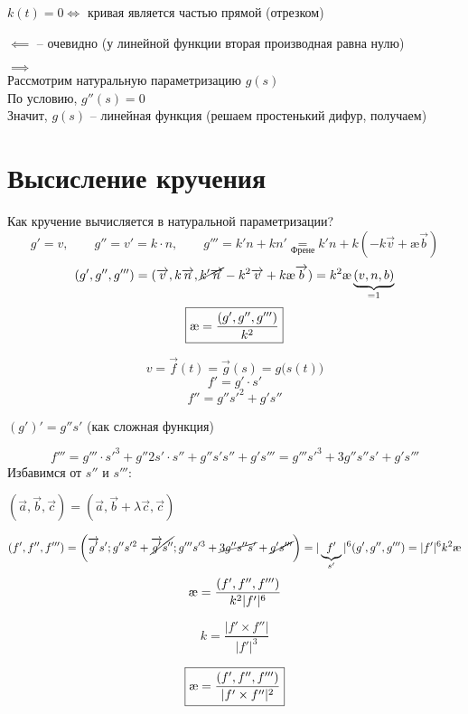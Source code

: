 \begin{theorem}
	$ k(t) = 0 \iff $ кривая является частью прямой (отрезком)
\end{theorem}

\begin{iproof}
	\item $ \impliedby $ -- очевидно (у линейной функции вторая производная равна нулю)
	\item $ \implies $ \\
	Рассмотрим натуральную параметризацию $ g(s) $ \\
	По условию, $ g''(s) = 0 $ \\
	Значит, $ g(s) $ -- линейная функция (решаем простенький дифур, получаем)
\end{iproof}

\section{Высисление кручения}

\begin{undefthm}{Как кручение вычисляется в натуральной параметризации?}
	$$ g' = v, \qquad g'' = v' = k \cdot n, \qquad g''' = k'n + kn' \underset{\text{Френе}}= k'n + k(-k\vec{v} + \text{\ae}\vec{b}) $$
	$$ (g', g'', g''') = (\vec{v}, k\vec{n}, \cancel{k'\vec{n}} - k^2\vec{v} + k\text\ae\vec{b}) = k^2 \text\ae\underbrace{(v, n, b)}_{= 1} $$
	$$ \boxed{\text\ae = \frac{(g', g'', g''')}{k^2}} $$
\end{undefthm}

$$ v = \vec{f}(t) = \vec{g}(s) = g \bigg( s(t) \bigg) $$
$$ f' = g' \cdot s' $$
$$ f'' = g''s'^2 + g's'' $$
\begin{remind}
	$ (g')' = g''s' $ (как сложная функция)
\end{remind}
$$ f''' = g''' \cdot s'^3 + g''2s' \cdot s'' + g''s's'' + g's''' = g'''s'^3 + 3g''s''s' + g's''' $$
Избавимся от $ s'' $ и $ s''' $:
\begin{remind}
	$ (\vec{a}, \vec{b}, \vec{c}) = (\vec{a}, \vec{b} + \lambda \vec{c}, \vec{c}) $
\end{remind}
$$ (f', f'', f''') = \bigg( \vec{g'}s'; g''s'^2 + \cancel{\vec{g'}s''}; g'''s'^3 + \cancel{3g''s''s'} + \cancel{g's'''} \bigg) = |\underbrace{f'}_{s'}|^6 (g', g'', g''') = |f'|^6k^2\text\ae $$
$$ \text\ae = \frac{(f', f'', f''')}{k^2|f'|^6} $$
\begin{remind}
	$$ k = \frac{|f' \times f''|}{|f'|^3} $$
\end{remind}
$$ \boxed{\text\ae = \frac{(f', f'', f''')}{|f' \times f''|^2}} $$

